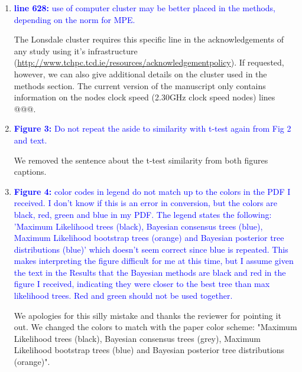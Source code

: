 \documentclass[12pt,letterpaper]{article}
\begin{document}
\begin{enumerate}
\item{\textcolor{blue}{\textbf{line 628:} use of computer cluster may be better placed in the methods, depending on the norm for MPE.}}

The Lonsdale cluster requires this specific line in the acknowledgements of any study using it's infrastructure (\url{http://www.tchpc.tcd.ie/resources/acknowledgementpolicy}).
If requested, however, we can also give additional details on the cluster used in the methods section.
The current version of the manuscript only contains information on the nodes clock speed (2.30GHz clock speed nodes) lines @@@.

\item{\textcolor{blue}{\textbf{Figure 3:} Do not repeat the aside to similarity with t-test again from Fig 2 and text.}}

We removed the sentence about the t-test similarity from both figures captions. %

\item{\textcolor{blue}{\textbf{Figure 4:} color codes in legend do not match up to the colors in the PDF I received. I don't know if this is an error in conversion, but the colors are black, red, green and blue in my PDF. The legend states the following: 'Maximum Likelihood trees (black), Bayesian consensus trees (blue), Maximum Likelihood bootstrap trees (orange) and Bayesian posterior tree distributions (blue)' which doesn't seem correct since blue is repeated. This makes interpreting the figure difficult for me at this time, but I assume given the text in the Results that the Bayesian methods are black and red in the figure I received, indicating they were closer to the best tree than max likelihood trees. Red and green should not be used together.}}

We apologies for this silly mistake and thanks the reviewer for pointing it out. We changed the colors to match with the paper color scheme: "Maximum Likelihood trees (black), Bayesian consensus trees (grey), Maximum Likelihood bootstrap trees (blue) and Bayesian posterior tree distributions (orange)".


\end{enumerate}
\end{document}
